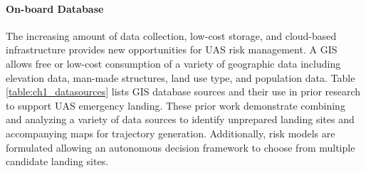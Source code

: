 \paragraph{On-board Database}

The increasing amount of data collection, low-cost storage, and cloud-based infrastructure provides new opportunities for \ac{UAS} risk management. A \ac{GIS} allows free or low-cost consumption of a variety of geographic data including elevation data, man-made structures, land use type, and population data.  Table \ref{table:ch1_datasources} lists \ac{GIS} database sources and their use in prior research to support \ac{UAS} emergency landing. These prior work demonstrate combining and analyzing a variety of data sources to identify unprepared landing sites and accompanying maps for trajectory generation. Additionally, risk models are formulated allowing an autonomous decision framework to choose from multiple candidate landing sites.

